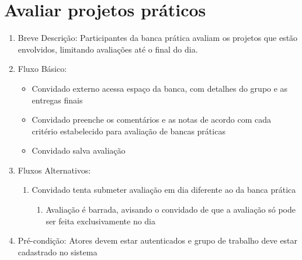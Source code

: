 \section{Avaliar projetos práticos}
\begin{enumerate}
    \item Breve Descrição: Participantes da banca prática avaliam os projetos que estão envolvidos, limitando avaliações até o final do dia.
    \item Fluxo Básico:
    \begin{itemize}
        \item Convidado externo acessa espaço da banca, com detalhes do grupo e as entregas finais
        \item Convidado preenche os comentários e as notas de acordo com cada critério estabelecido para avaliação de bancas práticas
        \item Convidado salva avaliação
    \end{itemize}
    \item Fluxos Alternativos:
    \begin{enumerate}
        \item Convidado tenta submeter avaliação em dia diferente ao da banca prática
        \begin{enumerate}
            \item Avaliação é barrada, avisando o convidado de que a avaliação só pode ser feita exclusivamente no dia
        \end{enumerate}
    \end{enumerate}
    \item Pré-condição: Atores devem estar autenticados e grupo de trabalho deve estar cadastrado no sistema
\end{enumerate}


